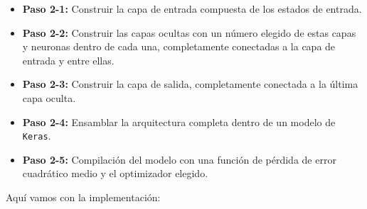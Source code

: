 \documentclass[
]{book}
\providecommand{\tightlist}{%
  \setlength{\itemsep}{0pt}\setlength{\parskip}{0pt}}
\begin{document}
\begin{itemize}
\tightlist
\item
  \textbf{Paso 2-1:} Construir la capa de entrada compuesta de los estados de entrada.
\item
  \textbf{Paso 2-2:} Construir las capas ocultas con un número elegido de estas capas y neuronas dentro de cada una, completamente conectadas a la capa de entrada y entre ellas.
\item
  \textbf{Paso 2-3:} Construir la capa de salida, completamente conectada a la última capa oculta.
\item
  \textbf{Paso 2-4:} Ensamblar la arquitectura completa dentro de un modelo de \texttt{Keras}.
\item
  \textbf{Paso 2-5:} Compilación del modelo con una función de pérdida de error cuadrático medio y el optimizador elegido.
\end{itemize}

Aquí vamos con la implementación:\\
\end{document}
